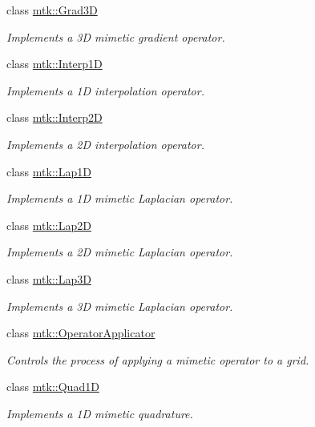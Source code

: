 \begin{DoxyCompactItemize}
class \hyperlink{classmtk_1_1Grad3D}{mtk\+::\+Grad3\+D}
\begin{DoxyCompactList}\small\item\em Implements a 3\+D mimetic gradient operator. \end{DoxyCompactList}\item 
class \hyperlink{classmtk_1_1Interp1D}{mtk\+::\+Interp1\+D}
\begin{DoxyCompactList}\small\item\em Implements a 1\+D interpolation operator. \end{DoxyCompactList}\item 
class \hyperlink{classmtk_1_1Interp2D}{mtk\+::\+Interp2\+D}
\begin{DoxyCompactList}\small\item\em Implements a 2\+D interpolation operator. \end{DoxyCompactList}\item 
class \hyperlink{classmtk_1_1Lap1D}{mtk\+::\+Lap1\+D}
\begin{DoxyCompactList}\small\item\em Implements a 1\+D mimetic Laplacian operator. \end{DoxyCompactList}\item 
class \hyperlink{classmtk_1_1Lap2D}{mtk\+::\+Lap2\+D}
\begin{DoxyCompactList}\small\item\em Implements a 2\+D mimetic Laplacian operator. \end{DoxyCompactList}\item 
class \hyperlink{classmtk_1_1Lap3D}{mtk\+::\+Lap3\+D}
\begin{DoxyCompactList}\small\item\em Implements a 3\+D mimetic Laplacian operator. \end{DoxyCompactList}\item 
class \hyperlink{classmtk_1_1OperatorApplicator}{mtk\+::\+Operator\+Applicator}
\begin{DoxyCompactList}\small\item\em Controls the process of applying a mimetic operator to a grid. \end{DoxyCompactList}\item 
class \hyperlink{classmtk_1_1Quad1D}{mtk\+::\+Quad1\+D}
\begin{DoxyCompactList}\small\item\em Implements a 1\+D mimetic quadrature. \end{DoxyCompactList}\item 

\end{DoxyCompactItemize}
